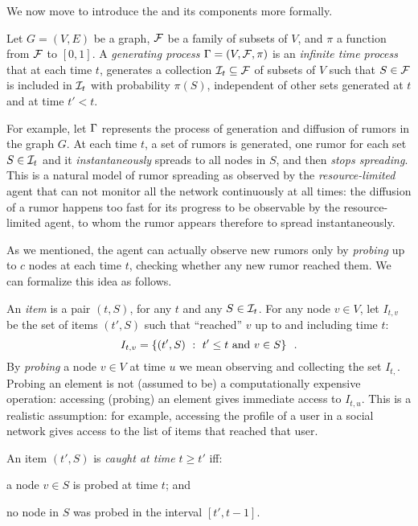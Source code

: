 We now move to introduce the \probname and its components more formally.

\begin{definition}\label{def:generating}
	Let $G=(V,E)$ be a graph, $\F$ be a family of subsets of $V$, and $\pi$ a
	function from $\F$ to $[0,1]$. A \emph{generating process} $\sys =
	(V,\F,\pi)$ is an \emph{infinite time process} that at each time $t$,
	generates a collection $\S_t\subseteq\F$ of subsets of $V$ such that $S\in
	\F$ is included in $\S_t$ with probability $\pi(S)$, independent of other
	sets generated at $t$ and at time $t'<t$.
\end{definition}

For example, let $\sys$ represents the process of generation and diffusion of
rumors in the graph $G$. At each time $t$, a set of rumors is generated, one
rumor for each set $S\in\S_t$ and it \emph{instantaneously} spreads to all
nodes in $S$, and then \emph{stops spreading}. This is a natural model of rumor
spreading as observed by the \emph{resource-limited} agent that can not monitor
all the network continuously at all times: the diffusion of a rumor happens too
fast for its progress to be observable by the resource-limited agent, to whom
the rumor appears therefore to spread instantaneously.

As we mentioned, the agent can actually observe new rumors only by
\emph{probing} up to $c$ nodes at each time $t$, checking whether any new
rumor reached them. We can formalize this idea as follows.

An \emph{item} is a pair $(t,S)$, for any $t$ and any $S\in\S_t$. For any
node $v\in V$, let $I_{t,v}$ be the set of items $(t',S)$ such that ``reached''
$v$ up to and including time $t$:
\[
	I_{t,v}=\set{(t',S) ~:~ t'\le t \mbox{ and } v\in S}\enspace.
\]
By \emph{probing} a node $v\in V$ at time $u$ we mean observing and
collecting the set $I_{t,}$. Probing an element is not (assumed to be) a
computationally expensive operation: accessing (probing) an element gives
immediate access to $I_{t,u}$. This is a realistic assumption: for example,
accessing the profile of a user in a social network gives access to the list of
items that reached that user.

An item $(t',S)$ is \emph{caught at time $t\geq t'$} iff:
\begin{enumerate*}
	\item a node $v\in S$ is probed at time $t$; and
	\item no node in $S$ was probed in the interval $[t',t-1]$.
\end{enumerate*}


